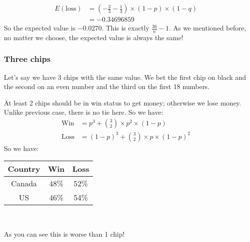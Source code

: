 \documentclass{book}
\begin{document}
	\begin{equation*}
		\begin{split}
			E(\text{loss}) &= (-\frac{2}{3} - \frac{1}{3}) \times (1 - p) \times (1 - q) \\
			&= -0.34696859
		\end{split}
	\end{equation*}
	So the expected value is $-0.0270$. This is exactly $\frac{36}{n} - 1$. As we mentioned before, no matter we choose, the expected value is always the same!
	\subsubsection{Three chips}
	Let's say we have 3 chips with the same value. We bet the first chip on black and the second on an even number and the third on the first 18 numbers.
	\par At least 2 chips should be in win status to get money; otherwise we lose money. Unlike previous case, there is no tie here. So we have:
	\begin{equation*}
		\begin{split}
			\text{Win} &= p^3 + \binom{3}{2} \times p^2 \times (1 - p) \\
			\text{Loss} &= (1 - p)^3 + \binom{3}{2} \times p \times (1 - p)^2
		\end{split}
	\end{equation*}
	So we have: \\
	\par
	\begin{tabular}[h!]{c c c}
	\toprule
	Country & Win & Loss \\
	\midrule
	Canada & 48\% & 52\% \\
	US & 46\% & 54\% \\
	\bottomrule
\end{tabular} \\
	\par
	\par As you can see this is worse than 1 chip!
\end{document}
